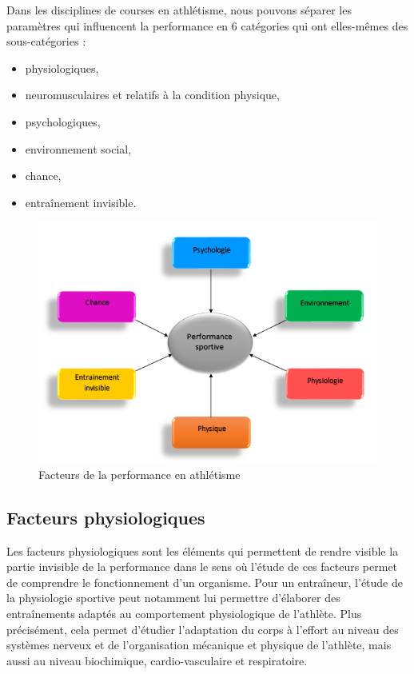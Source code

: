         Dans les disciplines de courses en athlétisme, nous pouvons séparer les paramètres qui influencent la performance en 6 catégories qui ont elles-mêmes des sous-catégories : 
        \begin{itemize}
            \item physiologiques,
            \item neuromusculaires et relatifs à la condition physique,
            \item psychologiques,
            \item environnement social,
            \item chance,
            \item entraînement invisible.
        \end{itemize}

        \begin{figure}[H]
            \centering
            \includegraphics[scale=0.69]{images/facteursPerf}
            \caption{\label{fig:facteursPerf}Facteurs de la performance en athlétisme}
        \end{figure}
        
        
        \subsection{Facteurs physiologiques}
        
        Les facteurs physiologiques sont les éléments qui permettent de rendre visible la partie invisible de la performance dans le sens où l'étude de ces facteurs permet de comprendre le fonctionnement d'un organisme. Pour un entraîneur, l’étude de la physiologie sportive peut notamment lui permettre d'élaborer des entraînements adaptés au comportement physiologique de l'athlète. Plus précisément, cela permet d'étudier l’adaptation du corps à l'effort au niveau des systèmes nerveux et de l'organisation mécanique et physique de l'athlète, mais aussi au niveau biochimique, cardio-vasculaire et respiratoire.\\
        
